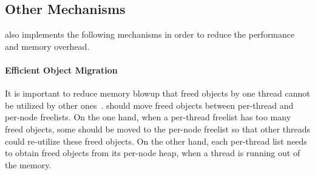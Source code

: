 \subsection{Other Mechanisms}
\label{sec: others}

\NM{} also implements the following mechanisms in order to reduce the performance and memory overhead. 

\paragraph{Efficient Object Migration} It is important to reduce memory blowup that freed objects by one thread cannot be utilized by other ones~\citep{Hoard}.  \NM{} should move freed objects between per-thread and per-node freelists. On the one hand, when a per-thread freelist has too many freed objects, some should be moved to the per-node freelist so that other threads could re-utilize these freed objects. On the other hand, each per-thread list needs to obtain freed objects from its per-node heap, when a thread is running out of the memory. 

